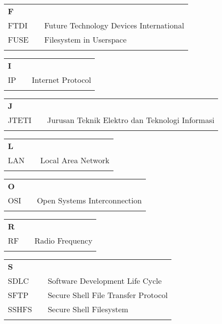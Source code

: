 \documentclass{tif-uin-suka}
\begin{document}
\begin{tabular}{p{20pt}p{3pt}l}
\textbf{F}\\
FTDI & & Future Technology Devices International\\
FUSE & & Filesystem in Userspace\\
\\
\end{tabular}

\begin{tabular}{p{20pt}p{3pt}l}
\textbf{I}\\
IP & & Internet Protocol\\
\\
\end{tabular}

\begin{tabular}{p{20pt}p{3pt}l}
\textbf{J}\\
JTETI & & Jurusan Teknik Elektro dan Teknologi Informasi\\
\\
\end{tabular}

\begin{tabular}{p{20pt}p{3pt}l}
\textbf{L}\\
LAN & & Local Area Network\\
\\
\end{tabular}

\begin{tabular}{p{20pt}p{3pt}l}
\textbf{O}\\
OSI & & Open Systems Interconnection\\
\\
\end{tabular}

\begin{tabular}{p{20pt}p{3pt}l}
\textbf{R}\\
RF & & Radio Frequency\\
\\
\end{tabular}

\begin{tabular}{p{20pt}p{3pt}l}
\textbf{S}\\
SDLC & & Software Development Life Cycle\\
SFTP & & Secure Shell File Transfer Protocol\\
SSHFS & & Secure Shell Filesystem\\
\\
\end{tabular}
\end{document}
